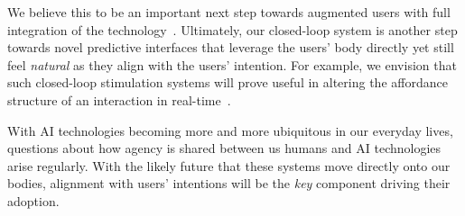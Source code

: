 We believe this to be an important next step towards augmented users with full integration of the technology~\cite{Mueller2020-dl}. Ultimately, our closed-loop system is another step towards novel predictive interfaces that leverage the users' body directly yet still feel \textit{natural} as they align with the users' intention. For example, we envision that such closed-loop stimulation systems will prove useful in altering the affordance structure of an interaction in real-time~\cite{Gehrke2022-kz, Lopes2015-ze, Nataraj2020-wm}.

With AI technologies becoming more and more ubiquitous in our everyday lives, questions about how agency is shared between us humans and AI technologies arise regularly. With the likely future that these systems move directly onto our bodies, alignment with users' intentions will be the \textit{key} component driving their adoption.